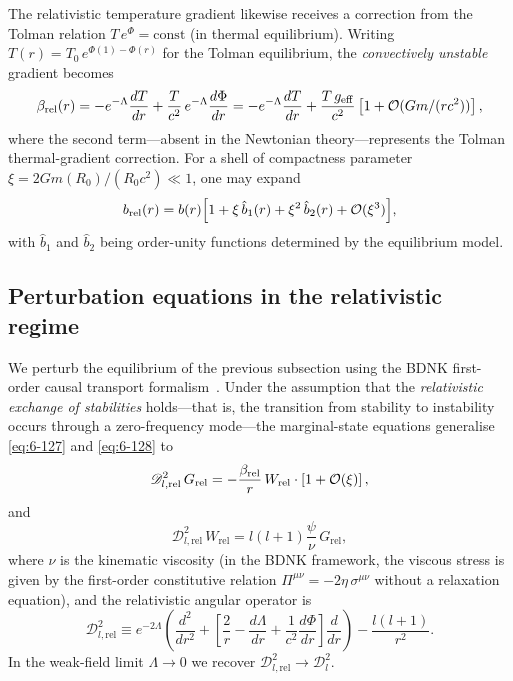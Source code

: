 The relativistic temperature gradient likewise receives a correction
from the Tolman relation $T\,e^{\Phi}=\text{const}$ (in thermal
equilibrium).  Writing $T(r) = T_{0}\,e^{\Phi(1)-\Phi(r)}$ for the
Tolman equilibrium, the \emph{convectively unstable} gradient becomes
\begin{equation}\label{eq:rel-60-7}
\beta_{\mathrm{rel}}(r) = -e^{-\Lambda}\frac{dT}{dr}
  + \frac{T}{c^{2}}\,e^{-\Lambda}\frac{d\Phi}{dr}
  = -e^{-\Lambda}\frac{dT}{dr}
  + \frac{T\,g_{\mathrm{eff}}}{c^{2}}
  \left[1 + \mathcal{O}(Gm/(rc^{2}))\right],
\end{equation}
where the second term---absent in the Newtonian theory---represents
the Tolman thermal-gradient correction.  For a shell of compactness
parameter $\xi = 2Gm(R_0)/(R_0 c^{2})\ll 1$, one may expand
\begin{equation}\label{eq:rel-60-8}
b_{\mathrm{rel}}(r) = b(r)\Bigl[1 + \xi\,\hat{b}_{1}(r)
  + \xi^{2}\,\hat{b}_{2}(r) + \mathcal{O}(\xi^{3})\Bigr],
\end{equation}
with $\hat{b}_{1}$ and $\hat{b}_{2}$ being order-unity functions
determined by the equilibrium model.

\subsection{Perturbation equations in the relativistic regime}
\label{sec:rel-60-perturb}

We perturb the equilibrium of the previous subsection using the
BDNK first-order causal transport
formalism~\cite{BemficaDN2018,Kovtun2019}.
Under the assumption that the \emph{relativistic exchange of
stabilities} holds---that is, the transition from stability to
instability occurs through a zero-frequency mode---the marginal-state
equations generalise \eqref{eq:6-127} and \eqref{eq:6-128} to
\begin{equation}\label{eq:rel-60-9}
\mathscr{D}_{l,\mathrm{rel}}^{2}\,G_{\mathrm{rel}}
  = -\frac{\beta_{\mathrm{rel}}}{r}\,W_{\mathrm{rel}}
  \cdot\left[1 + \mathcal{O}(\xi)\right],
\end{equation}
and
\begin{equation}\label{eq:rel-60-10}
\mathscr{D}_{l,\mathrm{rel}}^{2}\,W_{\mathrm{rel}}
  = l(l+1)\frac{\psi}{\nu}\,G_{\mathrm{rel}},
\end{equation}
where $\nu$ is the kinematic viscosity
(in the BDNK framework, the viscous stress is given by the
first-order constitutive relation
$\Pi^{\mu\nu} = -2\eta\,\sigma^{\mu\nu}$ without a relaxation
equation), and the relativistic angular operator is
\begin{equation}\label{eq:rel-60-11}
\mathscr{D}_{l,\mathrm{rel}}^{2} \equiv
  e^{-2\Lambda}\!\left(\frac{d^{2}}{dr^{2}}
  + \left[\frac{2}{r} - \frac{d\Lambda}{dr}
          + \frac{1}{c^{2}}\frac{d\Phi}{dr}\right]
    \frac{d}{dr}\right)
  -\frac{l(l+1)}{r^{2}}.
\end{equation}
In the weak-field limit $\Lambda\to 0$ we recover
$\mathscr{D}_{l,\mathrm{rel}}^{2}\to\mathscr{D}_{l}^{2}$.


